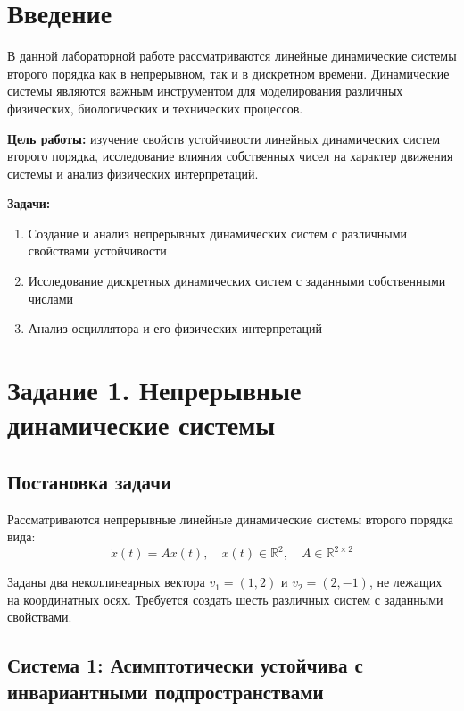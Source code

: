 \section*{Введение}

В данной лабораторной работе рассматриваются линейные динамические системы второго порядка как в непрерывном, так и в дискретном времени. Динамические системы являются важным инструментом для моделирования различных физических, биологических и технических процессов.

\textbf{Цель работы:} изучение свойств устойчивости линейных динамических систем второго порядка, исследование влияния собственных чисел на характер движения системы и анализ физических интерпретаций.

\textbf{Задачи:}
\begin{enumerate}
    \item Создание и анализ непрерывных динамических систем с различными свойствами устойчивости
    \item Исследование дискретных динамических систем с заданными собственными числами
    \item Анализ осциллятора и его физических интерпретаций
\end{enumerate}

\section*{Задание 1. Непрерывные динамические системы}

\subsection*{Постановка задачи}

Рассматриваются непрерывные линейные динамические системы второго порядка вида:
\begin{equation}
\dot{x}(t) = Ax(t), \quad x(t) \in \mathbb{R}^2, \quad A \in \mathbb{R}^{2 \times 2}
\end{equation}

Заданы два неколлинеарных вектора $v_1 = (1, 2)$ и $v_2 = (2, -1)$, не лежащих на координатных осях. Требуется создать шесть различных систем с заданными свойствами.

\subsection*{Система 1: Асимптотически устойчива с инвариантными подпространствами}

